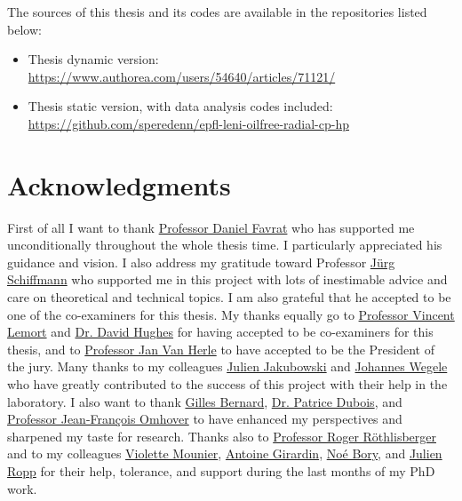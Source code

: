 The sources of this thesis and its codes are available in the
repositories listed below:

\begin{itemize}
\item Thesis dynamic version:\\
  \href{https://www.authorea.com/users/54640/articles/71121/}{https://www.authorea.com/users/54640/articles/71121/}
\item Thesis static version, with data analysis codes included:\\
  \href{https://github.com/speredenn/epfl-leni-oilfree-radial-cp-hp}{https://github.com/speredenn/epfl-leni-oilfree-radial-cp-hp}
\end{itemize}

\section*{Acknowledgments}
\label{sec:thanks}

First of all I want to thank
\href{https://ch.linkedin.com/pub/daniel-favrat/9/564/3a5}{Professor
  Daniel Favrat} who has supported me unconditionally throughout the
whole thesis time. I particularly appreciated his guidance and
vision. I also address my gratitude toward Professor
\href{http://people.epfl.ch/jurg.schiffmann}{Jürg
  Schiffmann} who supported me in this project with lots of
inestimable advice and care on theoretical and technical topics. I am
also grateful that he accepted to be one of the co-examiners for this
thesis. My thanks equally go to
\href{https://be.linkedin.com/pub/vincent-lemort/19/860/bb6}{Professor
  Vincent Lemort} and
\href{https://uk.linkedin.com/pub/david-hughes/13/658/29}{Dr. David
  Hughes} for having accepted to be co-examiners for this thesis, and
to \href{http://people.epfl.ch/jan.vanherle}{Professor Jan Van Herle} to have accepted to be the
President of the jury. Many thanks to my colleagues
\href{https://ch.linkedin.com/pub/julien-jakubowski/9/599/67a}{Julien
  Jakubowski} and
\href{https://de.linkedin.com/pub/johannes-wegele/23/27a/897/en}{Johannes
  Wegele} who have greatly contributed to the success of this project
with their help in the laboratory. I also want to thank
\href{https://fr.linkedin.com/pub/gilles-bernard/28/2a7/534/en}{Gilles
  Bernard},
\href{https://fr.linkedin.com/pub/patrice-dubois/23/2aa/922/en}{Dr. Patrice
  Dubois}, and \href{https://fr.linkedin.com/in/jfomhover}{Professor
  Jean-François Omhover} to have enhanced my perspectives and
sharpened my taste for research. Thanks also to
\href{http://www.sib.heig-vd.ch/institut/Lists/quipe/DispForm.aspx?ID=3}{Professor
  Roger Röthlisberger} and to my colleagues
\href{https://ch.linkedin.com/pub/violette-mounier/80/347/952/en}{Violette
  Mounier},
\href{https://ch.linkedin.com/pub/antoine-girardin/36/47a/5a1/en}{Antoine
  Girardin},
\href{https://ch.linkedin.com/pub/noe-bory/42/276/ba7}{Noé Bory}, and
\href{http://www.sib.heig-vd.ch/institut/Lists/quipe/DispForm.aspx?ID=1}{Julien
  Ropp} for their help, tolerance, and support during the last months
of my PhD work.

